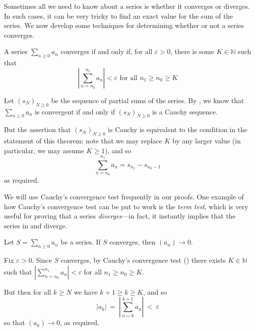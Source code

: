 Sometimes all we need to know about a series is whether it converges or diverges. In such cases, it can be very tricky to find an exact value for the sum of the series. We now develop some techniques for determining whether or not a series converges.

\begin{theorem}
\label{thmCauchyConvergenceTest}
A series $\displaystyle \sum_{n \ge 0} a_n$ converges if and only if, for all $\varepsilon > 0$, there is some $K \in \mathbb{N}$ such that
\[ \left| \sum_{n=n_0}^{n_1} a_n \right| < \varepsilon \text{ for all } n_1 \ge n_0 \ge K \]
\end{theorem}

\begin{cproof}
Let $(s_N)_{N \ge 0}$ be the sequence of partial sums of the series. By , we know that $\displaystyle \sum_{n \ge 0} a_n$ is convergent if and only if $(s_N)_{N \ge 0}$ is a Cauchy sequence.

But the assertion that $(s_N)_{N \ge 0}$ is Cauchy is equivalent to the condition in the statement of this theorem: note that we may replace $K$ by any larger value (in particular, we may assume $K \ge 1$), and so
\[ \sum_{n=n_0}^{n_1} a_n = s_{n_1} - s_{n_0-1} \]
as required.
\end{cproof}

We will use Cauchy's convergence test frequently in our proofs. One example of how Cauchy's convergence test can be put to work is the \textit{term test}, which is very useful for proving that a series \textit{diverges}---in fact, it instantly implies that the series in  and  diverge.

\begin{theorem}
\label{thmIfSeriesConvergentThenTermsTendToZero}
Let $\displaystyle S = \sum_{n \ge 0} a_n$ be a series. If $S$ converges, then $(a_n) \to 0$.
\end{theorem}

\begin{cproof}
Fix $\varepsilon > 0$. Since $S$ converges, by Cauchy's convergence test () there exists $K \in \mathbb{N}$ such that $\displaystyle \left| \sum_{n=n_0}^{n_1} a_n \right| < \varepsilon$ for all $n_1 \ge n_0 \ge K$.

But then for all $k \ge N$ we have $k+1 \ge k \ge K$, and so
\[ |a_k| ~=~ \left| \sum_{n=k}^{k+1} a_n \right| ~<~ \varepsilon \]
so that $(a_k) \to 0$, as required.
\end{cproof}

